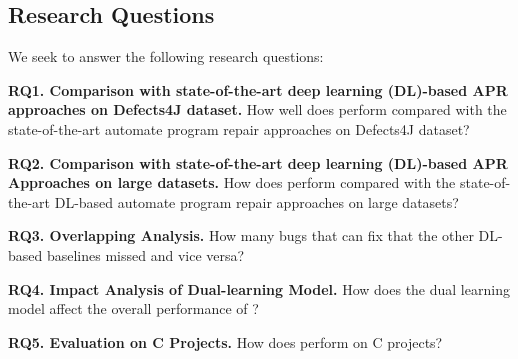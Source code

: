 \subsection{Research Questions}

We seek to answer the following research questions:

\noindent\textbf{RQ1. Comparison with state-of-the-art deep learning
  (DL)-based APR approaches on Defects4J dataset.}  How well does
                {\tool} perform compared with the state-of-the-art
                automate program repair approaches on Defects4J
                dataset?


\noindent\textbf{RQ2. Comparison with state-of-the-art deep learning
  (DL)-based APR Approaches on large datasets.}  How does {\tool}
perform compared with the state-of-the-art DL-based automate program repair
approaches on large datasets?


\noindent\textbf{RQ3. Overlapping Analysis.} How many bugs that
{\tool} can fix that the other DL-based baselines
                missed and vice versa?

\noindent\textbf{RQ4. Impact Analysis of Dual-learning Model.} How does the dual learning model affect the overall performance of {\tool}?


\noindent\textbf{RQ5. Evaluation on C Projects.} How does {\tool} perform on C projects?
